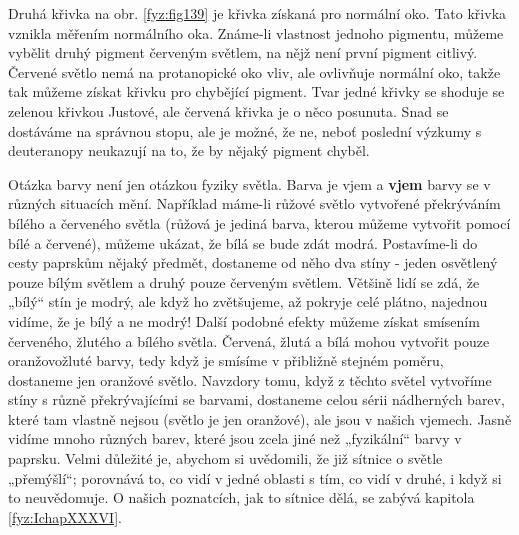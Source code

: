     Druhá křivka na obr. \ref{fyz:fig139} je křivka získaná pro normální oko. Tato křivka vznikla
    měřením normálního oka. Známe-li vlastnost jednoho pigmentu, můžeme vybělit druhý pigment
    červeným světlem, na nějž není první pigment citlivý. Červené světlo nemá na protanopické oko
    vliv, ale ovlivňuje normální oko, takže tak můžeme získat křivku pro chybějící pigment. Tvar
    jedné křivky se shoduje se zelenou křivkou Justové, ale červená křivka je o něco posunuta. Snad
    se dostáváme na správnou stopu, ale je možné, že ne, neboť poslední výzkumy s deuteranopy
    neukazují na to, že by nějaký pigment chyběl.
    
    Otázka barvy není jen otázkou fyziky světla. Barva je vjem a \textbf{vjem} barvy se v různých 
    situacích mění. Například máme-li růžové světlo vytvořené překrýváním bílého a červeného světla 
    (růžová je jediná barva, kterou můžeme vytvořit pomocí bílé a červené), můžeme ukázat, že bílá 
    se bude zdát modrá. Postavíme-li do cesty paprskům nějaký předmět, dostaneme od něho dva stíny 
    - jeden osvětlený pouze bílým světlem a druhý pouze červeným světlem. Většině lidí se zdá, že 
    „bílý“ stín je modrý, ale když ho zvětšujeme, až pokryje celé plátno, najednou vidíme, že je 
    bílý a ne modrý! Další podobné efekty můžeme získat smísením červeného, žlutého a bílého 
    světla. Červená, žlutá a bílá mohou vytvořit pouze oranžovožluté barvy, tedy když je smísíme v 
    přibližně stejném poměru, dostaneme jen oranžové světlo. Navzdory tomu, když z těchto světel 
    vytvoříme stíny s různě překrývajícími se barvami, dostaneme celou sérii nádherných barev, 
    které tam vlastně nejsou (světlo je jen oranžové), ale jsou v našich vjemech. Jasně vidíme 
    mnoho různých barev, které jsou zcela jiné než „fyzikální“ barvy v paprsku. Velmi důležité je, 
    abychom si uvědomili, že již sítnice o světle „přemýšlí“; porovnává to, co vidí v jedné oblasti 
    s tím, co vidí v druhé, i když si to neuvědomuje. O našich poznatcích, jak to sítnice dělá, se 
    zabývá kapitola \ref{fyz:IchapXXXVI}. 
    

